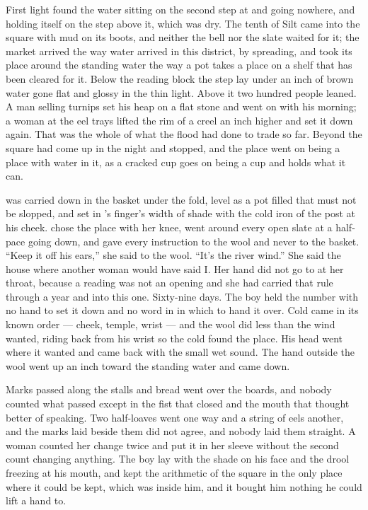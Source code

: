 
First light found the water sitting on the second step at  and going nowhere, and  holding itself on the step above it, which was dry. The tenth of Silt came into the square with mud on its boots, and neither the bell nor the slate waited for it; the market arrived the way water arrived in this district, by spreading, and took its place around the standing water the way a pot takes a place on a shelf that has been cleared for it. Below the reading block the step lay under an inch of brown water gone flat and glossy in the thin light. Above it two hundred people leaned. A man selling turnips set his heap on a flat stone and went on with his morning; a woman at the eel trays lifted the rim of a creel an inch higher and set it down again. That was the whole of what the flood had done to trade so far. Beyond the square  had come up in the night and stopped, and the place went on being a place with water in it, as a cracked cup goes on being a cup and holds what it can.

 was carried down in the basket under the fold, level as a pot filled that must not be slopped, and set in 's finger's width of shade with the cold iron of the post at his cheek.  chose the place with her knee, went around every open slate at a half-pace going down, and gave every instruction to the wool and never to the basket. “Keep it off his ears,” she said to the wool. “It's the river wind.” She said the house where another woman would have said I. Her hand did not go to  at her throat, because a reading was not an opening and she had carried that rule through a year and into this one. Sixty-nine days. The boy held the number with no hand to set it down and no word in  in which to hand it over. Cold came in its known order --- cheek, temple, wrist --- and the wool did less than the wind wanted, riding back from his wrist so the cold found the place. His head went where it wanted and came back with the small wet sound. The hand outside the wool went up an inch toward the standing water and came down.

Marks passed along the stalls and bread went over the boards, and nobody counted what passed except in the fist that closed and the mouth that thought better of speaking. Two half-loaves went one way and a string of eels another, and the marks laid beside them did not agree, and nobody laid them straight. A woman counted her change twice and put it in her sleeve without the second count changing anything. The boy lay with the shade on his face and the drool freezing at his mouth, and kept the arithmetic of the square in the only place where it could be kept, which was inside him, and it bought him nothing he could lift a hand to.

